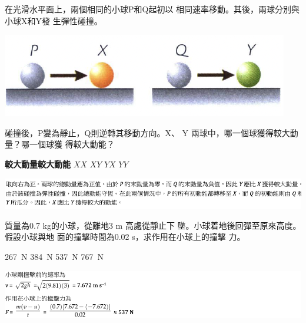 {
    在光滑水平面上，兩個相同的小球P和Q起初以 相同速率移動。其後，兩球分別與小球X和Y發 生彈性碰撞。
    \par{\par\centering\includegraphics[width=.45\textwidth]{./img/ch5_momentum_mc_2024-05-11-21-21-41.png}\par}
    碰撞後，P變為靜止，Q則逆轉其移動方向。X、 Y 兩球中，哪一個球獲得較大動量？哪一個球獲 得較大動能？
    \begin{tasks}
        \task [] \textbf{較大動量}\tab\tab \textbf{較大動能}
        \task $X$\tab\tab$X$
        \task $X$\tab\tab$Y$
        \task $Y$\tab\tab$X$
        \task $Y$\tab\tab$Y$

    \end{tasks}

}{
    \par{\par\centering\includegraphics[width=\textwidth]{./img/ch5_momentum_mc_2024-05-11-22-50-19.png}\par}
}

{
    質量為0.7 kg的小球，從離地3 m 高處從靜止下 墜。小球着地後回彈至原來高度。假設小球與地 面的撞擊時間為0.02 s，求作用在小球上的撞擊 力。
    \begin{tasks}
        \task \qty{267}{N}
        \task \qty{384}{N}
        \task \qty{537}{N}
        \task \qty{767}{N}
    \end{tasks}

}{
    \par{\par\centering\includegraphics[width=\textwidth]{./img/ch5_momentum_mc_2024-05-11-22-50-08.png}\par}
}

